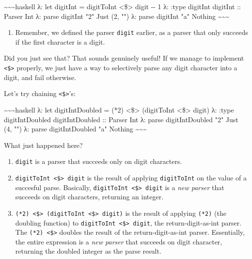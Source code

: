 \documentclass[]{article}
\begin{document}
\textasciitilde{}\textasciitilde{}\textasciitilde{}haskell λ: let digitInt =
digitToInt \textless{}\$\textgreater{} digit -\/- 1 λ: :type digitInt digitInt
:: Parser Int λ: parse digitInt "2" Just (2, "") λ: parse digitInt "a" Nothing
\textasciitilde{}\textasciitilde{}\textasciitilde{}

\begin{enumerate}
\tightlist
\item
  Remember, we defined the parser \texttt{digit} earlier, as a parser that only
  succeeds if the first character is a digit.
\end{enumerate}

Did you just see that? That sounds genuinely useful! If we manage to implement
\texttt{\textless{}\$\textgreater{}} properly, we just have a way to selectively
parse any digit character into a digit, and fail otherwise.

Let's try chaining \texttt{\textless{}\$\textgreater{}}'s:

\textasciitilde{}\textasciitilde{}\textasciitilde{}haskell λ: let
digitIntDoubled = (*2) \textless{}\$\textgreater{} (digitToInt
\textless{}\$\textgreater{} digit) λ: :type digitIntDoubled digitIntDoubled ::
Parser Int λ: parse digitIntDoubled "2" Just (4, "") λ: parse digitIntDoubled
"a" Nothing \textasciitilde{}\textasciitilde{}\textasciitilde{}

What just happened here?

\begin{enumerate}
\tightlist
\item
  \texttt{digit} is a parser that succeeds only on digit characters.
\item
  \texttt{digitToInt\ \textless{}\$\textgreater{}\ digit} is the result of
  applying \texttt{digitToInt} on the value of a succesful parse. Basically,
  \texttt{digitToInt\ \textless{}\$\textgreater{}\ digit} is a \emph{new parser}
  that succeeds on digit characters, returning an integer.
\item
  \texttt{(*2)\ \textless{}\$\textgreater{}\ (digitToInt\ \textless{}\$\textgreater{}\ digit)}
  is the result of applying \texttt{(*2)} (the doubling function) to
  \texttt{digitToInt\ \textless{}\$\textgreater{}\ digit}, the
  return-digit-as-int parser. The \texttt{(*2)\ \textless{}\$\textgreater{}}
  doubles the result of the return-digit-as-int parser. Essentially, the entire
  expression is a \emph{new parser} that succeeds on digit character, returning
  the doubled integer as the parse result.
\end{enumerate}
\end{document}

